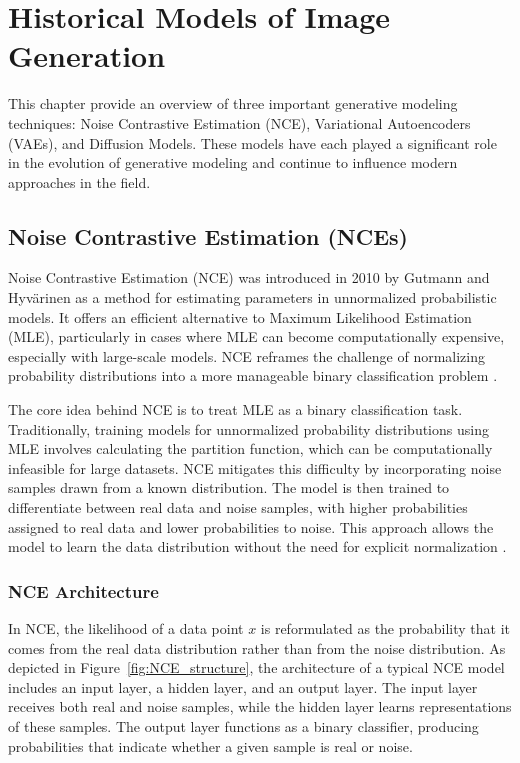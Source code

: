 \chapter{Historical Models of Image Generation}

This chapter provide an overview of three important generative modeling techniques: Noise Contrastive Estimation (NCE), Variational Autoencoders (VAEs), and Diffusion Models. These models have each played a significant role in the evolution of generative modeling and continue to influence modern approaches in the field. 

\section{Noise Contrastive Estimation (NCEs)}

Noise Contrastive Estimation (NCE) was introduced in 2010 by Gutmann and Hyvärinen as a method for estimating parameters in unnormalized probabilistic models. It offers an efficient alternative to Maximum Likelihood Estimation (MLE), particularly in cases where MLE can become computationally expensive, especially with large-scale models. NCE reframes the challenge of normalizing probability distributions into a more manageable binary classification problem \citep{10.48550/arxiv.1711.00658}. 

The core idea behind NCE is to treat MLE as a binary classification task. Traditionally, training models for unnormalized probability distributions using MLE involves calculating the partition function, which can be computationally infeasible for large datasets. NCE mitigates this difficulty by incorporating noise samples drawn from a known distribution. The model is then trained to differentiate between real data and noise samples, with higher probabilities assigned to real data and lower probabilities to noise. This approach allows the model to learn the data distribution without the need for explicit normalization \citep{10.48550/arxiv.2110.11271}.

\subsection{NCE Architecture}
In NCE, the likelihood of a data point \( x \) is reformulated as the probability that it comes from the real data distribution rather than from the noise distribution. As depicted in Figure~\ref{fig:NCE_structure}, the architecture of a typical NCE model includes an input layer, a hidden layer, and an output layer. The input layer receives both real and noise samples, while the hidden layer learns representations of these samples. The output layer functions as a binary classifier, producing probabilities that indicate whether a given sample is real or noise.

